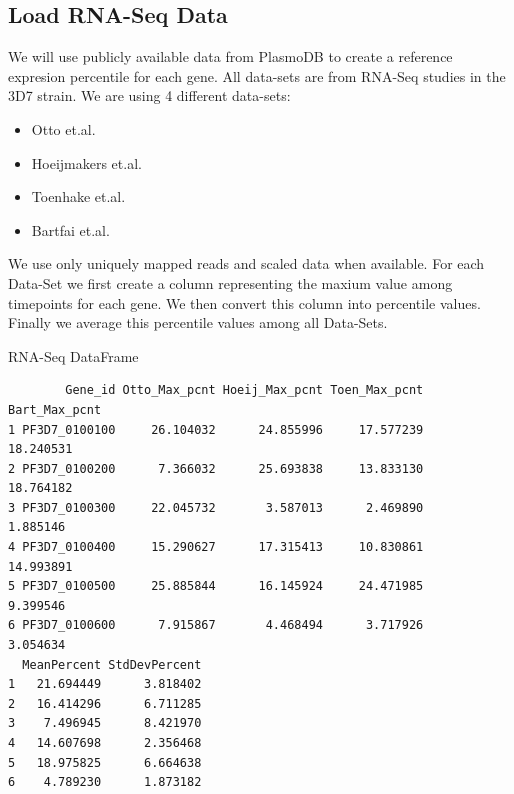 \documentclass[11pt]{article}
\begin{document}
\subsection{Load RNA-Seq Data}
\label{sec:org3bb7944}
We will use publicly available data from PlasmoDB to create a reference expresion percentile for each gene.
All data-sets are from RNA-Seq studies in the 3D7 strain.
We are using 4 different data-sets:
\begin{itemize}
\item Otto et.al.
\item Hoeijmakers et.al.
\item Toenhake et.al.
\item Bartfai et.al.
\end{itemize}

We use only uniquely mapped reads and scaled data when available.
For each Data-Set we first create a column representing the maxium value among timepoints for each gene. We then convert this column into percentile values. Finally we average this percentile values among all Data-Sets.


RNA-Seq DataFrame
\begin{verbatim}
        Gene_id Otto_Max_pcnt Hoeij_Max_pcnt Toen_Max_pcnt Bart_Max_pcnt
1 PF3D7_0100100     26.104032      24.855996     17.577239     18.240531
2 PF3D7_0100200      7.366032      25.693838     13.833130     18.764182
3 PF3D7_0100300     22.045732       3.587013      2.469890      1.885146
4 PF3D7_0100400     15.290627      17.315413     10.830861     14.993891
5 PF3D7_0100500     25.885844      16.145924     24.471985      9.399546
6 PF3D7_0100600      7.915867       4.468494      3.717926      3.054634
  MeanPercent StdDevPercent
1   21.694449      3.818402
2   16.414296      6.711285
3    7.496945      8.421970
4   14.607698      2.356468
5   18.975825      6.664638
6    4.789230      1.873182
\end{verbatim}
\end{document}
